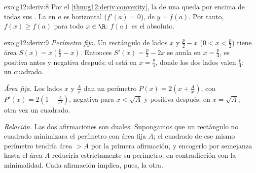 \begin{solution}{exo:g12:deriv:8}
Por el \cref{thm:g12:deriv:convexity}, la  de una  
 queda por encima de todas sus . La  en $a$ es
horizontal ($f'(a) = 0$), de  $y = f(a)$. Por tanto,
$f(x) \geq f(a)$ para todo $x \in \R$: $f(a)$ es el  absoluto.
\end{solution}

\begin{solution}{exo:g12:deriv:9}
\emph{Perímetro fijo.} Un rectángulo de lados $x$ y $\frac{p}{2} - x$
($0 < x < \frac p2$) tiene área $S(x) = x\left(\frac p2 - x\right)$.
Entonces $S'(x) = \frac p2 - 2x$ se anula en $x = \frac p4$, es positiva
antes y negativa después: el  está en $x = \frac{p}{4}$, donde los
dos lados valen $\frac p4$; un cuadrado.

\emph{Área fija.} Los lados $x$ y $\frac Ax$ dan un perímetro
$P(x) = 2\left(x + \frac Ax\right)$, con
$P'(x) = 2\left(1 - \frac{A}{x^2}\right)$, negativa para $x < \sqrt A$ y
positiva después:  en $x = \sqrt{A}$; otra vez un cuadrado.

\emph{Relación.} Las dos afirmaciones son duales. Supongamos que un
rectángulo no cuadrado minimizara el perímetro con área fija $A$; el
cuadrado de ese mismo perímetro tendría área $> A$ por la primera
afirmación, y encogerlo por semejanza hasta el área $A$ reduciría
estrictamente su perímetro, en contradicción con la minimalidad. Cada
afirmación implica, pues, la otra.
\end{solution}

